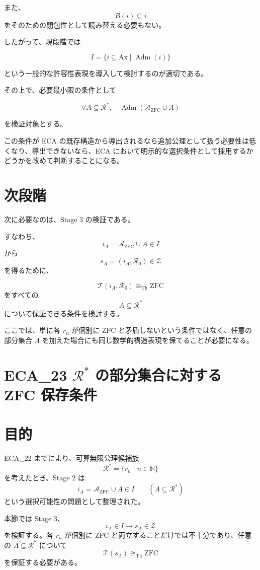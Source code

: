 \documentclass[a4paper,11pt]{article}
\newcommand{\Ax}{\mathrm{Ax}}
\begin{document}
また、
\[
B(i)\subseteq i
\]
をそのための閉包性として読み替える必要もない。

したがって、現段階では

\[
\boxed{
I=\{i\subseteq\Ax\mid\operatorname{Adm}(i)\}
}
\]

という一般的な許容性表現を導入して検討するのが適切である。

その上で、必要最小限の条件として

\[
\boxed{
\forall A\subseteq\mathcal{R}^*,
\quad
\operatorname{Adm}
(\mathcal{A}_{\mathrm{ZFC}}\cup A)
}
\]

を検証対象とする。

この条件が ECA の既存構造から導出されるなら追加公理として扱う必要性は低くなり、導出できないなら、ECA において明示的な選択条件として採用するかどうかを改めて判断することになる。

\section{次段階}

次に必要なのは、Stage 3 の検証である。

すなわち、
\[
i_A=\mathcal{A}_{\mathrm{ZFC}}\cup A\in I
\]
から
\[
s_A=(i_A,\mathcal{R}_0)\in\mathcal Z
\]
を得るために、

\[
\mathcal T(i_A,\mathcal{R}_0)
\cong_{\mathrm{Th}}
\mathrm{ZFC}
\]
をすべての
\[
A\subseteq\mathcal{R}^*
\]
について保証できる条件を検討する。

ここでは、単に各 $r_n$ が個別に ZFC と矛盾しないという条件ではなく、任意の部分集合 $A$ を加えた場合にも同じ数学的構造表現を保てることが必要になる。

\section{ECA_23 \(\mathcal{R}^*\) の部分集合に対する ZFC 保存条件}


\section{目的}
ECA_22 までにより、可算無限公理候補族
\[
\mathcal{R}^*=\{r_n\mid n\in\mathbb{N}\}
\]
を考えたとき、Stage 2 は
\[
i_A=\mathcal{A}_{\mathrm{ZFC}}\cup A\in I
\qquad(A\subseteq\mathcal{R}^*)
\]
という選択可能性の問題として整理された。

本節では Stage 3、
\[
i_A\in I\longrightarrow s_A\in\mathcal{Z}
\]
を検証する。各 \(r_n\) が個別に ZFC と両立することだけでは不十分であり、任意の \(A\subseteq\mathcal{R}^*\) について
\[
\mathcal{T}(s_A)\cong_{\mathrm{Th}}\mathrm{ZFC}
\]
を保証する必要がある。
\end{document}
